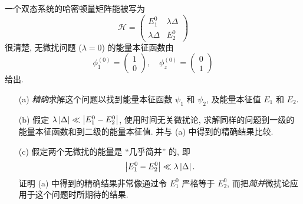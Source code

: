 \documentclass{assignment}
\begin{document}
\begin{prob}[课本习题 5.11]
    一个双态系统的哈密顿量矩阵能被写为
    \[
        \mathcal{H}=\begin{pmatrix}
            E_1^0&\lambda\Delta\\
            \lambda\Delta&E_2^0
        \end{pmatrix}
    \]
    很清楚, 无微扰问题 ($\lambda=0$) 的能量本征函数由
    \[
        \phi_1^{(0)}=\begin{pmatrix}
            1\\
            0
        \end{pmatrix},\quad\phi_z^{(0)}=\begin{pmatrix}
            0\\
            1
        \end{pmatrix}
    \]
    给出.
    \begin{itemize}
        \item[(a)] \textit{精确}求解这个问题以找到能量本征函数 $\psi_1$ 和 $\psi_2$, 及能量本征值 $E_1$ 和 $E_2$.
        \item[(b)] 假定 $\lambda\left\lvert\Delta\right\rvert\ll\left\lvert E_1^0-E_2^0\right\rvert$, 使用时间无关微扰论, 求解同样的问题到一级的能量本征函数和到二级的能量本征值. 并与 (a) 中得到的精确结果比较.
        \item[(c)] 假定两个无微扰的能量是 ``几乎简并'' 的, 即
        \[
            \left\lvert E_1^0-E_2^0\right\rvert\ll\lambda\left\lvert\Delta\right\rvert.
        \]
        证明 (a) 中得到的精确结果非常像通过令 $E_1^0$ 严格等于 $E_2^0$, 而把\textit{简并}微扰论应用于这个问题时所期待的结果.
    \end{itemize}
\end{prob}
\end{document}

